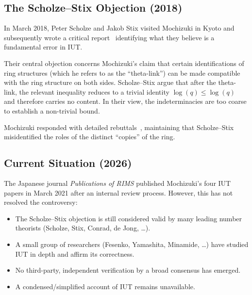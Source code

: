 \documentclass[12pt,a4paper]{article}
\theoremstyle{remark}
\begin{document}
\subsection{The Scholze--Stix Objection (2018)}

In March 2018, Peter Scholze and Jakob Stix visited Mochizuki in Kyoto and subsequently
wrote a critical report~\cite{ScholzeStix2018} identifying what they believe is a
fundamental error in IUT.

Their central objection concerns Mochizuki's claim that certain identifications of
ring structures (which he refers to as the ``theta-link'') can be made compatible with the
ring structure on both sides.  Scholze--Stix argue that after the theta-link, the relevant
inequality reduces to a trivial identity $\log(q) \leq \log(q)$ and therefore carries no
content.  In their view, the indeterminacies are too coarse to establish a non-trivial
bound.

Mochizuki responded with detailed rebuttals~\cite{Mochizuki2018rebuttal}, maintaining
that Scholze--Stix misidentified the roles of the distinct ``copies'' of the ring.

\subsection{Current Situation (2026)}

The Japanese journal \textit{Publications of RIMS} published Mochizuki's four IUT papers
in March 2021 after an internal review process.  However, this has not resolved the
controversy:
\begin{itemize}[nosep]
  \item The Scholze--Stix objection is still considered valid by many leading number
    theorists (Scholze, Stix, Conrad, de Jong, \ldots).
  \item A small group of researchers (Fesenko, Yamashita, Minamide, \ldots) have studied
    IUT in depth and affirm its correctness.
  \item No third-party, independent verification by a broad consensus has emerged.
  \item A condensed/simplified account of IUT remains unavailable.
\end{itemize}
\end{document}
